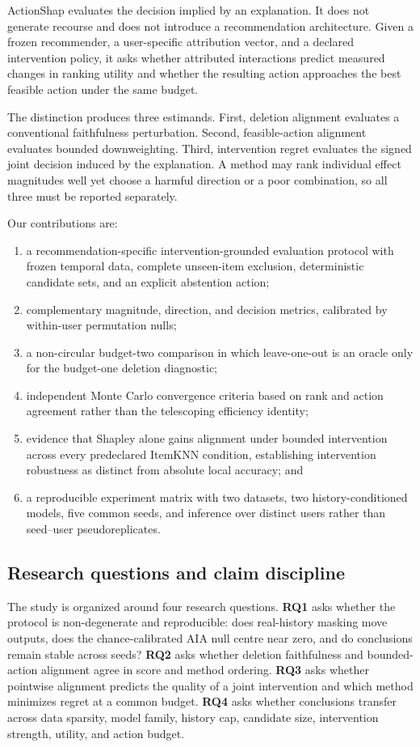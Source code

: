 \documentclass[11pt]{article}
\begin{document}
ActionShap evaluates the decision implied by an explanation. It does not generate recourse and does not introduce a recommendation architecture. Given a frozen recommender, a user-specific attribution vector, and a declared intervention policy, it asks whether attributed interactions predict measured changes in ranking utility and whether the resulting action approaches the best feasible action under the same budget.

The distinction produces three estimands. First, deletion alignment evaluates a conventional faithfulness perturbation. Second, feasible-action alignment evaluates bounded downweighting. Third, intervention regret evaluates the signed joint decision induced by the explanation. A method may rank individual effect magnitudes well yet choose a harmful direction or a poor combination, so all three must be reported separately.

Our contributions are:
\begin{enumerate}
  \item a recommendation-specific intervention-grounded evaluation protocol with frozen temporal data, complete unseen-item exclusion, deterministic candidate sets, and an explicit abstention action;
  \item complementary magnitude, direction, and decision metrics, calibrated by within-user permutation nulls;
  \item a non-circular budget-two comparison in which leave-one-out is an oracle only for the budget-one deletion diagnostic;
  \item independent Monte Carlo convergence criteria based on rank and action agreement rather than the telescoping efficiency identity;
  \item evidence that Shapley alone gains alignment under bounded intervention across every predeclared ItemKNN condition, establishing intervention robustness as distinct from absolute local accuracy; and
  \item a reproducible experiment matrix with two datasets, two history-conditioned models, five common seeds, and inference over distinct users rather than seed--user pseudoreplicates.
\end{enumerate}

\subsection*{Research questions and claim discipline}
The study is organized around four research questions. \textbf{RQ1} asks whether the protocol is non-degenerate and reproducible: does real-history masking move outputs, does the chance-calibrated AIA null centre near zero, and do conclusions remain stable across seeds? \textbf{RQ2} asks whether deletion faithfulness and bounded-action alignment agree in score and method ordering. \textbf{RQ3} asks whether pointwise alignment predicts the quality of a joint intervention and which method minimizes regret at a common budget. \textbf{RQ4} asks whether conclusions transfer across data sparsity, model family, history cap, candidate size, intervention strength, utility, and action budget.
\end{document}
